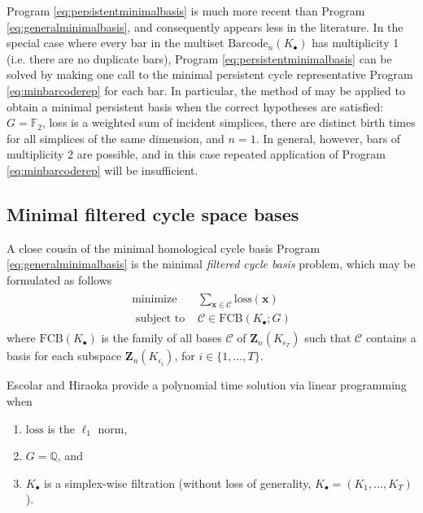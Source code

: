\documentclass[utf8]{formatting_stuff/frontiersFPHY}
\newcommand{\Q}{\mathbb{Q}}
\newcommand{\field}{\mathbb{F}}
\newcommand{\Cycles}[0]{\mathbf{Z}}
\newcommand{\optimalrep}{\mathbf{x}}
\newcommand{\barcode}{\mathrm{Barcode}}
\newcommand{\loss}{\mathrm{loss}}
\newcommand{\fcyclebasis}{\mathcal{C}}
\newcommand{\setoffilteredcyclebases}{\mathrm{FCB}}
\newcommand{\pr}{Program }
\theoremstyle{plain}
\theoremstyle{definition}
\begin{document}
\pr \eqref{eq:persistentminimalbasis} is much more recent than \pr \eqref{eq:generalminimalbasis}, and consequently appears less in the literature.   In the special case where every bar in the multiset $\barcode_n(K_\bullet)$ has multiplicity 1 (i.e. there are no duplicate bars), \pr \eqref{eq:persistentminimalbasis} can be solved by making one call to the minimal persistent cycle representative \pr \eqref{eq:minbarcoderep} for each bar.   In particular, the method of \cite{chenquantifying} may be applied to obtain a minimal persistent basis when the correct hypotheses are satisfied: $G = \field_2$, loss is a weighted sum of incident simplices, there are distinct birth times for all simplices of the same dimension, and $n=1$. In general, however, bars of multiplicity 2 are possible, and in this case repeated application of \pr \eqref{eq:minbarcoderep} will be insufficient.  

\subsection{Minimal filtered cycle space bases}

A close cousin of the minimal homological cycle basis \pr \eqref{eq:generalminimalbasis} is the minimal \emph{filtered cycle basis} problem, which may be formulated as  follows
\begin{align}
   \begin{split}
    \text{minimize } & \textstyle \sum_{\optimalrep \in \fcyclebasis} \loss(\optimalrep) \\
    \text{ subject to } & \fcyclebasis \in \setoffilteredcyclebases(K_\bullet ; G)
   \end{split}
   \label{eq:filteredminimalbasis}
\end{align}
where $\setoffilteredcyclebases(K_\bullet)$ is the family of all bases $\fcyclebasis$ of $\Cycles_n(K_{\epsilon_T})$ such that $\fcyclebasis$ contains a basis for each  subspace $\Cycles_n(K_{\epsilon_i})$, for $i \in \{1, \ldots, T\}$.  

Escolar and Hiraoka \cite{Escolar2016} provide a polynomial time solution via linear programming when
    \begin{enumerate}
        \item $\loss$ is the $\ell_1$ norm,
        \item $G = \Q$, and
        \item $K_\bullet$ is a simplex-wise filtration (without loss of generality, $K_\bullet = (K_1, \ldots, K_T)$).
    \end{enumerate}
    
\end{document}
